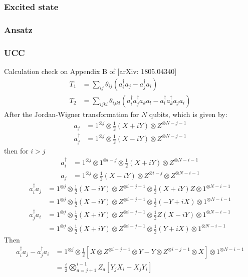 \documentclass[11pt, oneside]{article}   	%
\begin{document}
\subsubsection{Excited state}
\subsubsection{Ansatz}
\subsubsection{UCC}
Calculation  check on Appendix B of [arXiv: 1805.04340]
\begin{align} 
T_1 &= \sum_{ij} \theta_{ij} (a^{\dagger}_i a_j - a^{\dagger}_j a_i) \\
T_2 &= \sum_{ijkl} \theta_{ijkl} (a^{\dagger}_i a^{\dagger}_j a_k a_l - a^{\dagger}_l a^{\dagger}_k a_j a_i) 
\end{align}
After the Jordan-Wigner transformation for $N$ qubits, which is given by:
\begin{align} 
a_j &= 1^{\otimes j} \otimes \frac{1}{2} (X + i Y) \otimes Z^{\otimes N - j -1} \\
a^{\dagger}_j &= 1^{\otimes j} \otimes \frac{1}{2} (X - i Y) \otimes Z^{\otimes N - j -1} 
\end{align}
then for $i > j$
\begin{align} 
a^{\dagger}_i &= 1^{\otimes j} \otimes 1^{\otimes i-j} \otimes  \frac{1}{2} (X + i Y) \otimes Z^{\otimes N - i -1} \\
a_j &= 1^{\otimes j} \otimes \frac{1}{2} (X - i Y) \otimes Z^{\otimes i - j} \otimes Z^{\otimes N - i -1}
\end{align}
\begin{align} 
a^{\dagger}_i a_j  
&= 1^{\otimes j} \otimes \frac{1}{2} (X - i Y) \otimes Z^{\otimes i-j-1} \otimes \frac{1}{2} (X + i Y) Z \otimes 1^{\otimes N - i -1} \\
&= 1^{\otimes j} \otimes \frac{1}{2} (X - i Y) \otimes Z^{\otimes i-j-1} \otimes \frac{1}{2} (-Y + i X) \otimes 1^{\otimes N - i -1} \\
a^{\dagger}_j a_i 
&= 1^{\otimes j} \otimes \frac{1}{2} (X + i Y) \otimes Z^{\otimes i - j-1}  \otimes \frac{1}{2} Z (X - i Y) \otimes 1^{\otimes N - i -1} \\
&= 1^{\otimes j} \otimes \frac{1}{2} (X + i Y) \otimes Z^{\otimes i-j-1} \otimes \frac{1}{2} (Y + i X) \otimes 1^{\otimes N - i -1} 
\end{align}
Then
\begin{align}
a^{\dagger}_i a_j - a^{\dagger}_j a_i 
&= 1^{\otimes j} \otimes  \frac{1}{2} 
\left[ X \otimes Z^{\otimes i-j-1} \otimes Y - Y \otimes Z^{\otimes i-j-1} \otimes X \right] 
\otimes 1^{\otimes N - i -1} \\
& = \frac{i}{2} \bigotimes^{i-1}_{a=j+1} Z_a \left[ Y_j X_i - X_j Y_i  \right] 
\end{align}
\end{document}
